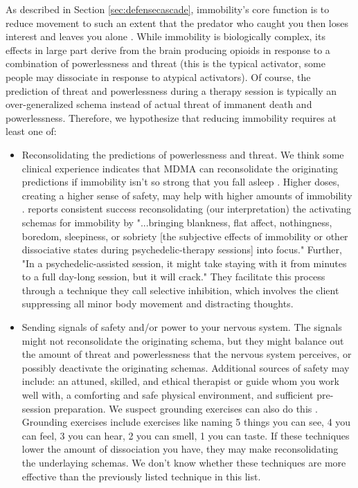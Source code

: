 \documentclass[12pt,letterpaper]{book}
\begin{document}
As described in Section \ref{sec:defensecascade}, immobility's core function is to reduce movement to such an extent that the predator who caught you then loses interest and leaves you alone \cite{kozlowskaDefenseCascade}. While immobility is biologically complex, its effects in large part derive from the brain producing opioids in response to a combination of powerlessness and threat (this is the typical activator, some people may dissociate in response to atypical activators). Of course, the prediction of threat and powerlessness during a therapy session is typically an over-generalized schema instead of actual threat of immanent death and powerlessness. Therefore, we hypothesize that reducing immobility requires at least one of:
\begin{itemize}
	\item Reconsolidating the predictions of powerlessness and threat. We think some clinical experience indicates that MDMA can reconsolidate the originating predictions if immobility isn't so strong that you fall asleep \cite{razviPSIP}. Higher doses, creating a higher sense of safety, may help with higher amounts of immobility \cite{regan2021Connection}. \textcite{razviPSIP} reports consistent success reconsolidating (our interpretation) the activating schemas for immobility by "...bringing blankness, flat affect, nothingness, boredom, sleepiness, or sobriety [the subjective effects of immobility or other dissociative states during psychedelic-therapy sessions] into focus." Further, "In a psychedelic-assisted session, it might take staying with it from minutes to a full day-long session, but it will crack." They facilitate this process through a technique they call selective inhibition, which involves the client suppressing all minor body movement and distracting thoughts.
	\item Sending signals of safety and/or power to your nervous system. The signals might not reconsolidate the originating schema, but they might balance out the amount of threat and powerlessness that the nervous system perceives, or possibly deactivate the originating schemas. Additional sources of safety may include: an attuned, skilled, and ethical therapist or guide whom you work well with, a comforting and safe physical environment, and sufficient pre-session preparation. We suspect grounding exercises can also do this \cite{fisherGrounding}. Grounding exercises include exercises like naming 5 things you can see, 4 you can feel, 3 you can hear, 2 you can smell, 1 you can taste. If these techniques lower the amount of dissociation you have, they may make reconsolidating the underlaying schemas. We don't know whether these techniques are more effective than the previously listed technique in this list.

\end{itemize}
\end{document}
